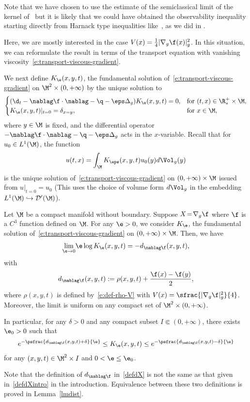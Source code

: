 Note that we have chosen to use the estimate of the semiclassical limit of the kernel of~\cite{LY86} but it is likely that we could have obtained the observability inequality starting directly from Harnack type inequalities like~\cite[Th.\,2.1]{LY86}, as we did in \cite{LL:18}.

Here, we are mostly interested in the case $V(x) = \frac14 |\nabla_g \f(x)|_g^2$. In this situation, we can reformulate the result in terms of the transport equation with vanishing viscosity~\eqref{e:transport-viscous-gradient}.

We next define $K_{\e}(x,y,t)$, the fundamental solution of~\eqref{e:transport-viscous-gradient} on $\M^2\times(0,+\infty)$ by the unique solution to
\begin{equation}
\label{e:transport-viscous-kernel}
\begin{cases}
(\d_t - \nablag \f \cdot \nablag -\q - \eps \Delta_g ) K_{\e}(x,y,t)= 0, & \text{for } (t,x) \in \R^+_*\times \M, \\
K_{\e}(x,y,t) |_{t=0} = \delta_{x=y}, & \text{for } x \in \M,
\end{cases}
\end{equation}
where $y \in \M$ is fixed, and the differential operator $- \nablag \f \cdot \nablag -\q - \eps \Delta_g$ acts in the $x$-variable.
Recall that for $u_0 \in L^1(\M)$, the function
\[
u(t,x) = \int_\M K_\eps(x,y,t)u_0(y) d\Vol_g(y)
\]
is the unique solution of~\eqref{e:transport-viscous-gradient} on $(0,+\infty)\times \M$ issued from $u|_{t=0} = u_0$ (This uses the choice of volume form $d\Vol_g$ in the embedding $L^1(\M) \hookrightarrow \mathcal{D}'(\M)$).

\begin{corollary}
\label{corLiYauconj}
Let $\M$ be a compact manifold without boundary. Suppose \hbox{$X\!=\!\nabla_g \f$} where $\f$ is a $C^3$ function defined on $\M$. For any $\e>0$, we consider $K_{\e}$, the fundamental solution of~\eqref{e:transport-viscous-gradient} on $(0,+\infty)\times \M$. Then, we have
\[
\underset{\e\to 0}{\lim}\e \log K_{\e}(x,y, t)=-d_{\nablag \f}(x,y,t),
\]
with
\begin{equation}
\label{defdX}
d_{\nablag \f}(x,y,t) := \rho(x,y,t)+ \frac{\f(x)-\f(y)}{2},
\end{equation}
where $\rho(x,y,t)$ is defined by~\eqref{e:def-rho-V} with $V(x) = \sfrac{|\nabla_g \f|_g^2}{4}$.
Moreover, the limit is uniform on any compact set of $\M^2 \times (0,+\infty)$.

In particular, for any $\delta>0$ and any compact subset $I \Subset (0,+\infty)$, there exists $\e_0>0$ such that
\begin{equation}
\label{inegkernel}
e^{-\psfrac{d_{\nablag \f}(x,y,t)+\delta}{\e}}\leq K_{\e}(x,y,t)\leq e^{-\psfrac{d_{\nablag \f}(x,y,t)-\delta}{\e}}
\end{equation}
for any $(x,y,t)\in \M^2 \times I$ and $0<\e\leq \e_0$.
\end{corollary}
Note that the definition of $d_{\nablag \f}$ in~\eqref{defdX} is not the same as that given in~\eqref{defdXintro} in the introduction. Equivalence between these two definitions is proved in Lemma~\ref{lmdist}.

